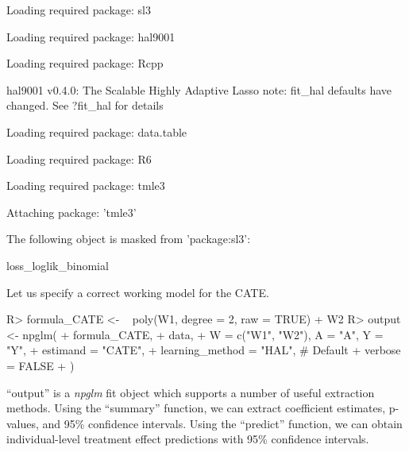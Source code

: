 \documentclass[
]{jss}
\begin{document}
\begin{CodeChunk}
\begin{CodeOutput}
Loading required package: sl3
\end{CodeOutput}
\begin{CodeOutput}
Loading required package: hal9001
\end{CodeOutput}
\begin{CodeOutput}
Loading required package: Rcpp
\end{CodeOutput}
\begin{CodeOutput}
hal9001 v0.4.0: The Scalable Highly Adaptive Lasso
note: fit_hal defaults have changed. See ?fit_hal for details
\end{CodeOutput}
\begin{CodeOutput}
Loading required package: data.table
\end{CodeOutput}
\begin{CodeOutput}
Loading required package: R6
\end{CodeOutput}
\begin{CodeOutput}
Loading required package: tmle3
\end{CodeOutput}
\begin{CodeOutput}

Attaching package: 'tmle3'
\end{CodeOutput}
\begin{CodeOutput}
The following object is masked from 'package:sl3':

    loss_loglik_binomial
\end{CodeOutput}
\end{CodeChunk}

Let us specify a correct working model for the CATE.

\begin{CodeChunk}
\begin{CodeInput}
R> formula_CATE <- ~ poly(W1, degree = 2, raw = TRUE) + W2
R> output <- npglm(
+       formula_CATE, 
+       data,
+       W = c("W1", "W2"), A = "A", Y = "Y",
+       estimand = "CATE", 
+       learning_method = "HAL", # Default
+       verbose = FALSE
+       )
\end{CodeInput}
\end{CodeChunk}

``output'' is a \textit{npglm} fit object which supports a number of
useful extraction methods. Using the ``summary'' function, we can
extract coefficient estimates, p-values, and 95\% confidence intervals.
Using the ``predict'' function, we can obtain individual-level treatment
effect predictions with 95\% confidence intervals.
\end{document}
